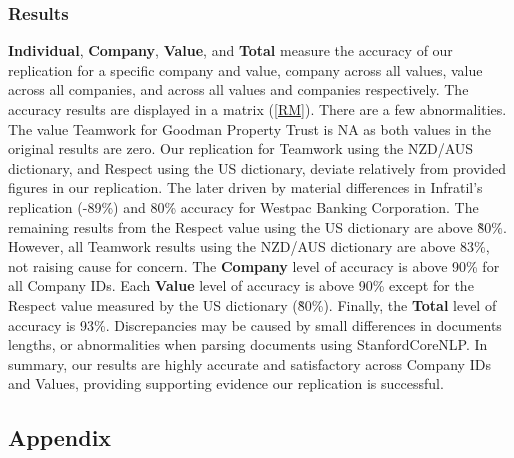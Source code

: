 \documentclass[11pt]{article}
\begin{document}
\subsubsection{Results}
\textbf{Individual}, \textbf{Company}, \textbf{Value}, and \textbf{Total} measure the accuracy of our replication for a specific company and value, company across all values, value across all companies, and across all values and companies respectively.
The accuracy results are displayed in a matrix (\ref{RM}). There are a few abnormalities. The value Teamwork for Goodman Property Trust is NA as both values in the original results are zero. 
Our replication for Teamwork using the NZD/AUS dictionary, and Respect using the US dictionary, deviate relatively from provided figures in our replication.
The later driven by material differences in Infratil's replication (-89\%) and 80\% accuracy for Westpac Banking Corporation.
The remaining results from the Respect value using the US dictionary are above \~80\%.
However, all Teamwork results using the NZD/AUS dictionary are above 83\%, not raising cause for concern.
The \textbf{Company} level of accuracy is above 90\% for all Company IDs.
Each \textbf{Value} level of accuracy is above 90\% except for the Respect value measured by the US dictionary (\~80\%). Finally, the \textbf{Total} level of accuracy is 93\%.
Discrepancies may be caused by small differences in documents lengths, or abnormalities when parsing documents using StanfordCoreNLP.
In summary, our results are highly accurate and satisfactory across Company IDs and Values, providing supporting evidence our replication is successful.
\newpage
\printbibliography
\subsection{Appendix}
\end{document}
